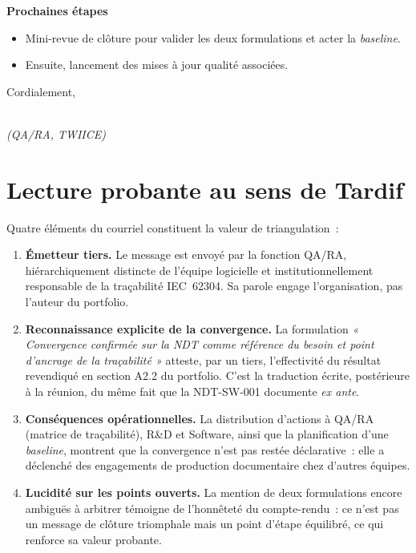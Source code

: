 \begin{tcolorbox}
\textbf{Prochaines étapes}
\begin{itemize}
  \item Mini-revue de clôture pour valider les deux formulations et acter la
        \emph{baseline}.
  \item Ensuite, lancement des mises à jour qualité associées.
\end{itemize}

\medskip
Cordialement,

\caviarder[4cm] \\
\caviarder[5.5cm] \hfill\textit{(QA/RA, TWIICE)}

\end{tcolorbox}

\bigskip

\section*{Lecture probante au sens de Tardif}

Quatre éléments du courriel constituent la valeur de triangulation~:

\begin{enumerate}
  \item \textbf{Émetteur tiers.} Le message est envoyé par la fonction QA/RA, hiérarchiquement distincte de l'équipe logicielle et institutionnellement responsable de la traçabilité IEC~62304. Sa parole engage l'organisation, pas l'auteur du portfolio.
  \item \textbf{Reconnaissance explicite de la convergence.} La formulation \emph{« Convergence confirmée sur la NDT comme référence du besoin et point d'ancrage de la traçabilité »} atteste, par un tiers, l'effectivité du résultat revendiqué en section A2.2 du portfolio. C'est la traduction écrite, postérieure à la réunion, du même fait que la NDT-SW-001 documente \emph{ex ante}.
  \item \textbf{Conséquences opérationnelles.} La distribution d'actions à QA/RA (matrice de traçabilité), R\&D et Software, ainsi que la planification d'une \emph{baseline}, montrent que la convergence n'est pas restée déclarative~: elle a déclenché des engagements de production documentaire chez d'autres équipes.
  \item \textbf{Lucidité sur les points ouverts.} La mention de deux formulations encore ambiguës à arbitrer témoigne de l'honnêteté du compte-rendu~: ce n'est pas un message de clôture triomphale mais un point d'étape équilibré, ce qui renforce sa valeur probante.
\end{enumerate}

